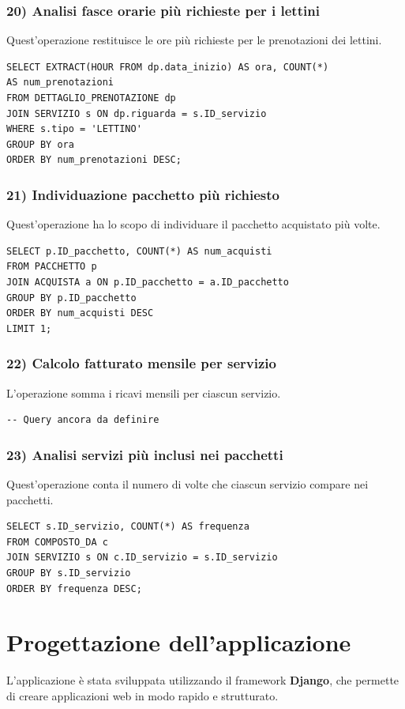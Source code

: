 \documentclass[a4paper,12pt]{report}
\begin{document}
\subsection*{20) Analisi fasce orarie più richieste per i lettini}
Quest'operazione restituisce le ore più richieste per le prenotazioni dei lettini.
\begin{verbatim}
SELECT EXTRACT(HOUR FROM dp.data_inizio) AS ora, COUNT(*) 
AS num_prenotazioni
FROM DETTAGLIO_PRENOTAZIONE dp
JOIN SERVIZIO s ON dp.riguarda = s.ID_servizio
WHERE s.tipo = 'LETTINO'
GROUP BY ora
ORDER BY num_prenotazioni DESC;
\end{verbatim}

\subsection*{21) Individuazione pacchetto più richiesto}
Quest'operazione ha lo scopo di individuare il pacchetto acquistato più volte.
\begin{verbatim}
SELECT p.ID_pacchetto, COUNT(*) AS num_acquisti
FROM PACCHETTO p
JOIN ACQUISTA a ON p.ID_pacchetto = a.ID_pacchetto
GROUP BY p.ID_pacchetto
ORDER BY num_acquisti DESC
LIMIT 1;
\end{verbatim}

\subsection*{22) Calcolo fatturato mensile per servizio}
L'operazione somma i ricavi mensili per ciascun servizio.

\begin{verbatim}
-- Query ancora da definire
\end{verbatim}

\subsection*{23) Analisi servizi più inclusi nei pacchetti}
Quest'operazione conta il numero di volte che ciascun servizio compare nei pacchetti.
\begin{verbatim}
SELECT s.ID_servizio, COUNT(*) AS frequenza
FROM COMPOSTO_DA c
JOIN SERVIZIO s ON c.ID_servizio = s.ID_servizio
GROUP BY s.ID_servizio
ORDER BY frequenza DESC;
\end{verbatim}

\chapter{Progettazione dell'applicazione}
L'applicazione è stata sviluppata utilizzando il framework \textbf{Django}, che permette
di creare applicazioni web in modo rapido e strutturato.
\end{document}
